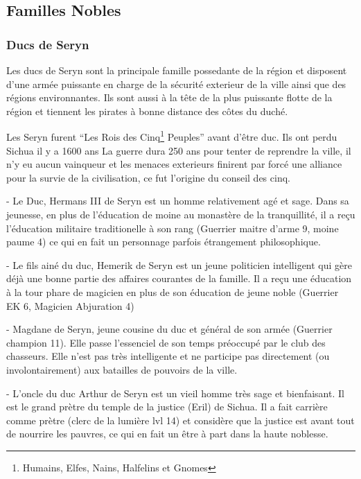 \subsection*{Familles Nobles}

\subsubsection*{Ducs de Seryn}

Les ducs de Seryn sont la principale famille possedante de la région et disposent
d'une armée puissante en charge de la sécurité exterieur de la ville ainsi que
des régions environnantes. Ils sont aussi à la tête de la plus puissante flotte de 
la région et tiennent les pirates à bonne distance des côtes du duché.

Les Seryn furent ``Les Rois des Cinq\footnote{Humains, Elfes, Nains, Halfelins 
et Gnomes} Peuples'' avant d'être duc. Ils ont perdu Sichua il y a 1600 ans  
La guerre dura 250 ans pour tenter de reprendre la ville, il n'y eu aucun 
vainqueur et les menaces exterieurs finirent par forcé une alliance pour la
survie de la civilisation, ce fut l'origine du conseil des cinq.

- Le Duc, Hermans III de Seryn est un homme relativement agé et sage. Dans sa
  jeunesse, en plus de l'éducation de moine au monastère de la tranquillité,
  il a reçu l'éducation militaire traditionelle à son rang 
  (Guerrier maitre d'arme 9, moine paume 4)
  ce qui en fait un personnage parfois étrangement philosophique.

- Le fils ainé du duc, Hemerik de Seryn est un jeune politicien intelligent 
  qui gère déjà une bonne partie des affaires courantes de la famille. Il
  a reçu une éducation à la tour phare de magicien en plus de son éducation
  de jeune noble (Guerrier EK 6, Magicien Abjuration 4)

- Magdane de Seryn, jeune cousine du duc et général de son armée 
  (Guerrier champion 11). Elle passe
  l'essenciel de son temps préoccupé par le club des chasseurs. Elle n'est
  pas très intelligente et ne participe pas directement (ou involontairement)
  aux batailles de pouvoirs de la ville.

- L'oncle du duc Arthur de Seryn est un vieil homme très sage et bienfaisant.
  Il est le grand prètre du temple de la justice (Eril) de Sichua. Il a fait
  carrière comme prètre (clerc de la lumière lvl 14) et considère que la 
  justice est avant tout de nourrire les pauvres, ce qui en fait un être à
  part dans la haute noblesse.

